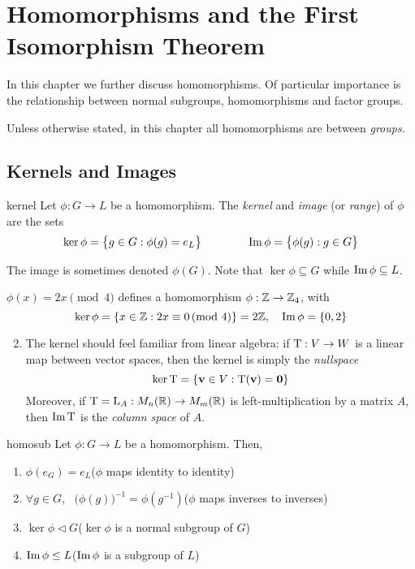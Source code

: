 \graphicspath{{7homo/asy/}}

\section{Homomorphisms and the First Isomorphism Theorem}\label{chap:homo}


In this chapter we further discuss homomorphisms. Of particular importance is the relationship between normal subgroups, homomorphisms and factor groups.\smallbreak

Unless otherwise stated, in this chapter all homomorphisms are between \emph{groups.}

\subsection{Kernels and Images}\label{sec:kerimage}

\begin{defn}{}{kernel}
Let $\phi:G\to L$ be a homomorphism. The \emph{kernel} and \emph{image} (or \emph{range}) of $\phi$ are the sets
\begin{gather*}
\ker\phi=\bigl\{g\in G:\phi(g)=e_L\bigr\}\qquad\qquad\operatorname{Im}\phi=\bigl\{\phi(g):g\in G\bigr\}
\end{gather*}
\end{defn}

The image is sometimes denoted $\phi(G)$. Note that $\ker\phi\subseteq G$ while $\operatorname{Im}\phi\subseteq L$.

\begin{examples}{}{}
\exstart $\phi(x)=2x\pmod 4$ defines a homomorphism $\phi:\mathbb{Z}\to\mathbb{Z}_4$, with
\[\ker\phi=\{x\in\mathbb{Z}:2x\equiv 0\negthickspace\pmod 4\}=2\mathbb{Z},\quad \operatorname{Im}\phi=\{0,2\}\]
\begin{enumerate}\setcounter{enumi}{1}
  \item The kernel should feel familiar from linear algebra: if $\mathrm{T}:V\to W$ is a linear map between vector spaces, then the kernel is simply the \emph{nullspace}
	\[\ker\mathrm{T}=\{{\mathbf{v}}\in V:\mathrm{T}({\mathbf{v}})=\mathbf{0}\}\]
	Moreover, if $\mathrm{T}=\mathrm{L}_A:M_n(\mathbb{R})\to M_m(\mathbb{R})$ is left-multiplication by a matrix $A$, then $\operatorname{Im}\mathrm{T}$ is the \emph{column space} of $A$.
\end{enumerate}
\end{examples}



\begin{lemm}{}{homosub}
Let $\phi:G\to L$ be a homomorphism. Then,
\begin{enumerate}
  \item $\phi(e_G)=e_L$\hfill ($\phi$ maps identity to identity)
  \item $\forall g\in G$, \ $\bigl(\phi(g)\bigr)^{-1}=\phi(g^{-1})$\hfill($\phi$ maps inverses to inverses)
  \item $\ker\phi\triangleleft G$\hfill($\ker\phi$ is a normal subgroup of $G$)
  \item $\operatorname{Im}\phi\le L$\hfill($\operatorname{Im}\phi$ is a subgroup of $L$)
\end{enumerate}
\end{lemm}

